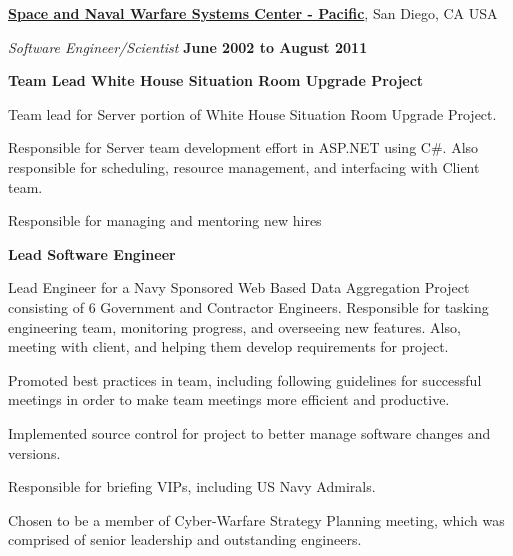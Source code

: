 \documentclass[10pt]{article}
\begin{document}
\halfblankline



\href{http://www.spawar.navy.mil/}{\textbf{Space and Naval Warfare Systems Center - Pacific}},
San Diego, CA USA
\begin{outerlist}
\item[] \textit{Software Engineer/Scientist}%
    \hfill \textbf{June 2002 to August 2011}
    \begin{innerlist}%
    \item \textbf{Team Lead White House Situation Room Upgrade Project}
    \begin{innerlist}%
    \item Team lead for Server portion of White House Situation Room Upgrade Project.
  \item Responsible for Server team development effort in ASP.NET using C\#. Also responsible for scheduling, resource management, and interfacing with Client team. 
  \item Responsible for managing and mentoring new hires 
	\end{innerlist}
	
	\item \textbf{Lead Software Engineer}
    \begin{innerlist}%
    \item Lead Engineer for a Navy Sponsored Web Based Data Aggregation Project consisting of 6 Government and Contractor Engineers.  Responsible for tasking engineering team, monitoring progress, and overseeing new features. Also, meeting with client, and helping them develop requirements for project.  
  \item Promoted best practices in team, including following guidelines for successful meetings in order to make team meetings more efficient and productive. 
  \item Implemented source control for project to better manage software changes and versions.
  \item Responsible for briefing VIPs, including US Navy Admirals.
  \item Chosen to be a member of Cyber-Warfare Strategy Planning meeting, which was comprised of senior leadership and outstanding engineers.
	\end{innerlist}
	

\end{innerlist}
\end{outerlist}
\end{document}
